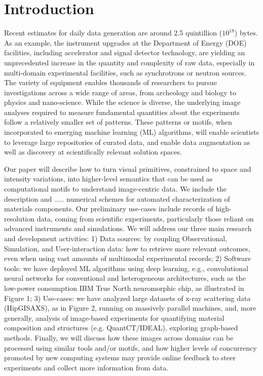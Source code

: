 \section{Introduction}
Recent estimates for daily data generation are around 2.5 quintillion ($10^{18}$) bytes. As an example, the instrument upgrades at the Department of Energy (DOE) facilities, including accelerator and signal detector technology, are yielding an unprecedented increase in the quantity and complexity of raw data, especially in multi-domain experimental facilities, such as synchrotrons or neutron sources. The variety of equipment enables thousands of researchers to pursue investigations across a wide range of areas, from archeology and biology to physics and nano-science. While the science is diverse, the underlying image analyses required to measure fundamental quantities about the experiments follow a relatively smaller set of patterns. These patterns or motifs, when incorporated to emerging machine learning (ML) algorithms, will enable scientists to leverage large repositories of curated data, and enable data augmentation as well as discovery at scientifically relevant solution spaces.

Our paper will describe how to turn visual primitives, constrained to space and intensity variations, into higher-level semantics that can be used as computational motifs to understand image-centric data. We include the description and .....
 numerical schemes for automated characterization of materials components. Our preliminary use-cases include records of high-resolution data, coming from scientific experiments, particularly those reliant on advanced instruments and simulations. We will address our three main research and development activities:
1) Data sources: by coupling Observational, Simulation, and User-interaction data: how to retrieve
more relevant outcomes, even when using vast amounts of multimodal experimental records;
2) Software tools: we have deployed ML algorithms using deep learning, e.g., convolutional neural
networks for conventional and heterogeneous architectures, such as the low-power consumption IBM True
North neuromorphic chip, as illustrated in Figure 1;
3) Use-cases: we have analyzed large datasets of x-ray scattering data (HipGISAXS), as in Figure 2,
running on massively parallel machines, and, more generally, analysis of image-based experiments for
quantifying material composition and structures (e.g. QuantCT/IDEAL), exploring graph-based methods.
Finally, we will discuss how these images across domains can be processed using similar tools and/or
motifs, and how higher levels of concurrency promoted by new computing systems may provide online
feedback to steer experiments and collect more information from data.



